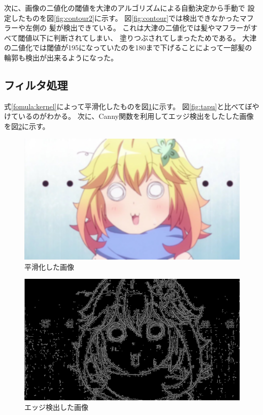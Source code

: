 \documentclass[dvipdfmx]{jsarticle}
\begin{document}
次に、画像の二値化の閾値を大津のアルゴリズムによる自動決定から手動で
設定したものを図\ref{fig:contour2}に示す。
図\ref{fig:contour}では検出できなかったマフラーや左側の
髪が検出できている。
これは大津の二値化では髪やマフラーがすべて閾値以下に判断されてしまい、
塗りつぶされてしまったためである。
大津の二値化では閾値が195になっていたのを180まで下げることによって一部髪の
輪郭も検出が出来るようになった。

\subsection{フィルタ処理}

式\ref{fomula:kernel}によって平滑化したものを図\ref{fig:smoothing}に示す。
図\ref{fig:tapu}と比べてぼやけているのがわかる。
次に、Canny関数を利用してエッジ検出をしたした画像を図\ref{fig:canny1}に示す。


\begin{figure}[htbp]
    \centering
    \includegraphics[width=0.9\hsize]{../pic/smoothing.png}
    \caption{平滑化した画像}
    \label{fig:smoothing}
\end{figure}
\begin{figure}[htbp]
  \centering
    \includegraphics[width=0.9\hsize]{../pic/canny1.png}
    \caption{エッジ検出した画像}
    \label{fig:canny1}
\end{figure}
\end{document}
